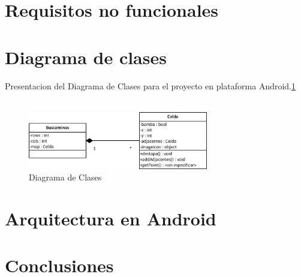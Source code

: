 \documentclass[11pt]{article} %
\begin{document}
\section{Requisitos no funcionales }
\section{Diagrama de clases }

\begin{center}
Presentacion del Diagrama de Clases para el proyecto en plataforma Android.\ref{fig:diagclass}
\\\
	\begin{figure}[h!]
  		\centering
    		\includegraphics[width=0.7\textwidth]{imagenes/buscamina_diagclass.png}
  		\caption{Diagrama de Clases}
		\label{fig:diagclass}
	\end{figure}
\end{center}

\section{Arquitectura en Android}
\section{Conclusiones}
\end{document}
